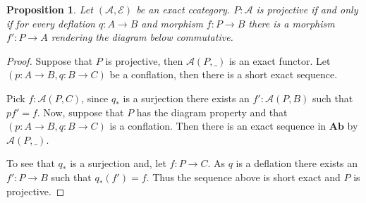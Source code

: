 \documentclass[11pt]{article}
\newtheorem{prop}[theorem]{Proposition}
\theoremstyle{definition}
\theoremstyle{remark}
\begin{document}
            \begin{prop}
                Let $(\mathcal{A},\mathcal{E})$ be an exact ccategory. $P:\mathcal{A}$ is projective if and only if for every deflation $q:A\rightarrow B$ and morphism $f:P\rightarrow B$  there is a morphism $f':P\rightarrow A$ rendering the diagram below commutative.
                \begin{center}
                \end{center}
            \end{prop}

            \begin{proof}
                Suppose that $P$ is projective, then $\mathcal{A}(P,\_)$ is an exact functor. Let $(p:A\rightarrow B,q:B\rightarrow C)$ be a conflation, then there is a short exact sequence.
                \begin{center}
                \end{center}
                Pick $f:\mathcal{A}(P,C)$, since $q_*$ is a surjection there exists an $f':\mathcal{A}(P,B)$ such that $pf'=f$.
                Now, suppose that $P$ has the diagram property and that $(p:A\rightarrow B,q:B\rightarrow C)$ is a conflation. Then there is an exact sequence in $\textbf{Ab}$ by $\mathcal{A}(P,\_)$.
                \begin{center}
                \end{center}
                To see that $q_*$ is a surjection and, let $f:P\rightarrow C$. As $q$ is a deflation there exists an $f':P\rightarrow B$ such that $q_*(f')=f$. Thus the sequence above is short exact and $P$ is projective. 
            \end{proof}
\end{document}
